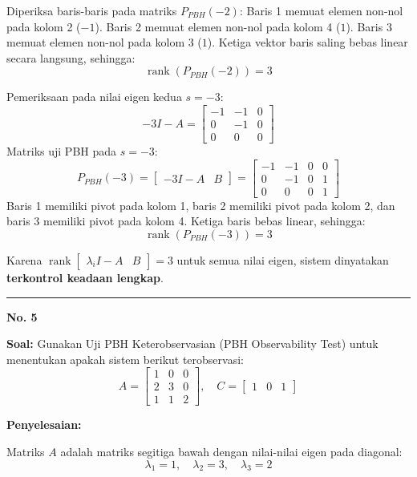 \documentclass[11pt,a4paper]{article}
\begin{document}
Diperiksa baris-baris pada matriks $P_{PBH}(-2)$:
Baris 1 memuat elemen non-nol pada kolom 2 ($-1$).
Baris 2 memuat elemen non-nol pada kolom 4 ($1$).
Baris 3 memuat elemen non-nol pada kolom 3 ($1$).
Ketiga vektor baris saling bebas linear secara langsung, sehingga:
$$\operatorname{rank}(P_{PBH}(-2)) = 3$$

Pemeriksaan pada nilai eigen kedua $s = -3$:
$$-3 I - A = \begin{bmatrix} -1 & -1 & 0 \\ 0 & -1 & 0 \\ 0 & 0 & 0 \end{bmatrix}$$
Matriks uji PBH pada $s = -3$:
$$P_{PBH}(-3) = \begin{bmatrix} -3I - A & B \end{bmatrix} = \begin{bmatrix} -1 & -1 & 0 & 0 \\ 0 & -1 & 0 & 1 \\ 0 & 0 & 0 & 1 \end{bmatrix}$$
Baris 1 memiliki pivot pada kolom 1, baris 2 memiliki pivot pada kolom 2, dan baris 3 memiliki pivot pada kolom 4. Ketiga baris bebas linear, sehingga:
$$\operatorname{rank}(P_{PBH}(-3)) = 3$$

Karena $\operatorname{rank} \begin{bmatrix} \lambda_i I - A & B \end{bmatrix} = 3$ untuk semua nilai eigen, sistem dinyatakan \textbf{terkontrol keadaan lengkap}.

\vspace{12pt}
\hrule
\vspace{10pt}

\textbf{\large No. 5}

\textbf{Soal:}  
Gunakan Uji PBH Keterobservasian (PBH Observability Test) untuk menentukan apakah sistem berikut terobservasi:
$$A = \begin{bmatrix} 1 & 0 & 0 \\ 2 & 3 & 0 \\ 1 & 1 & 2 \end{bmatrix}, \quad C = \begin{bmatrix} 1 & 0 & 1 \end{bmatrix}$$

\textbf{Penyelesaian:}

Matriks $A$ adalah matriks segitiga bawah dengan nilai-nilai eigen pada diagonal:
$$\lambda_1 = 1, \quad \lambda_2 = 3, \quad \lambda_3 = 2$$
\end{document}
